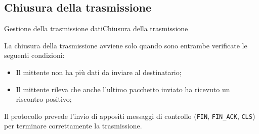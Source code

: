 \documentclass[10pt]{beamer}
\begin{document}
\subsection{Chiusura della trasmissione}
\begin{frame}{Gestione della trasmissione dati}{Chiusura della trasmissione}


La chiusura della trasmissione avviene solo quando sono entrambe verificate le seguenti condizioni: 

\begin{itemize}
\item Il mittente non ha più dati da inviare al destinatario;
\item Il mittente rileva che anche l'ultimo pacchetto inviato ha ricevuto un riscontro positivo;
\end{itemize}

\vspace*{10px}
Il protocollo prevede l'invio di appositi messaggi di controllo (\texttt{FIN}, \texttt{FIN\_ACK}, \texttt{CLS}) per terminare correttamente la trasmissione.


\end{frame}

{\1
\begin{frame}
\end{frame}}
\end{document}
